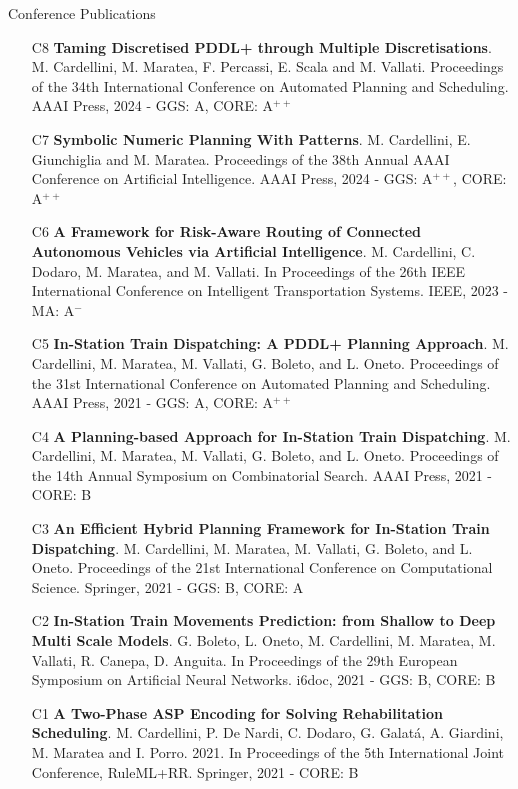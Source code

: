 \documentclass{resume} %
\begin{document}
\begin{rSection}{Conference Publications}
\begin{enumerate}[leftmargin=5mm]
	\item[C8] \textbf{Taming Discretised PDDL+ through Multiple Discretisations}. M. Cardellini, M. Maratea, F. Percassi, E. Scala and M. Vallati. Proceedings of the 34th International Conference on Automated Planning and Scheduling. AAAI Press, 2024 - GGS: A, CORE: A$^{++}$
	
	\item[C7] \textbf{Symbolic Numeric Planning With Patterns}. M. Cardellini, E. Giunchiglia and M. Maratea. Proceedings of the 38th Annual AAAI Conference on Artificial Intelligence. AAAI Press, 2024 - GGS: A$^{++}$, CORE: A$^{++}$
	
	\item[C6] \textbf{A Framework for Risk-Aware Routing of Connected Autonomous Vehicles via Artificial Intelligence}. M. Cardellini, C. Dodaro, M. Maratea, and M. Vallati. In Proceedings of the 26th IEEE International Conference on Intelligent Transportation Systems. IEEE, 2023 - MA: A$^-$
	
	\item[C5] \textbf{In-Station Train Dispatching: A PDDL+ Planning Approach}. M. Cardellini, M. Maratea, M. Vallati, G. Boleto, and L. Oneto. Proceedings of the 31st International Conference on Automated Planning and Scheduling. AAAI Press, 2021 - GGS: A, CORE: A$^{++}$
	
	\item[C4] \textbf{A Planning-based Approach for In-Station Train Dispatching}. M. Cardellini, M. Maratea, M. Vallati, G. Boleto, and L. Oneto.  Proceedings of the 14th Annual Symposium on Combinatorial Search. {AAAI} Press,  2021 - CORE: B
	
	\item[C3] \textbf{An Efficient Hybrid Planning Framework for In-Station Train Dispatching}. M. Cardellini, M. Maratea, M. Vallati, G. Boleto, and L. Oneto. Proceedings of the 21st International Conference on Computational Science. Springer, 2021 - GGS: B, CORE: A
	
	\item[C2] \textbf{In-Station Train Movements Prediction: from Shallow to Deep Multi Scale Models}. G. Boleto, L. Oneto, M. Cardellini, M. Maratea, M. Vallati, R. Canepa, D. Anguita. In Proceedings of the 29th European Symposium on Artificial Neural Networks. i6doc, 2021 - GGS: B, CORE: B
	
	\item[C1] \textbf{A Two-Phase ASP Encoding for Solving Rehabilitation Scheduling}. M. Cardellini, P. De Nardi, C. Dodaro, G. Galat\'a, A. Giardini, M. Maratea and I. Porro. 2021. In Proceedings of the 5th International Joint Conference, RuleML+RR. Springer, 2021 - CORE: B
\end{enumerate}
\end{rSection}
\end{document}
